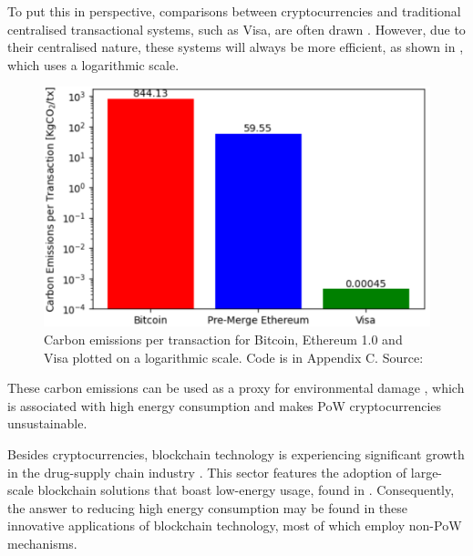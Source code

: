 To put this in perspective, comparisons between cryptocurrencies and traditional centralised transactional systems, such as Visa, are often drawn \cite{Kohli2023AnSolutions}. However, due to their centralised nature, these systems will always be more efficient, as shown in , which uses a logarithmic scale.

\begin{figure}[!htb]
    \centering
    \includegraphics[width=13cm,center]{Figures/CarbonEmissionsPlot.png}
    \caption{Carbon emissions per transaction for Bitcoin, Ethereum 1.0 and Visa plotted on a logarithmic scale. Code is in Appendix C. Source: \cite{Kohli2023AnSolutions} }
    \label{Figure:CarbonEmissionsPlot}
\end{figure}

These carbon emissions can be used as a proxy for environmental damage \cite{2022VisaReport}, which is associated with high energy consumption and makes PoW cryptocurrencies unsustainable.

Besides cryptocurrencies, blockchain technology is experiencing significant growth in the drug-supply chain industry \cite{Labaran2021TheNigeria}. This sector features the adoption of large-scale blockchain solutions that boast low-energy usage, found in . Consequently, the answer to reducing high energy consumption may be found in these innovative applications of blockchain technology, most of which employ non-PoW mechanisms.

